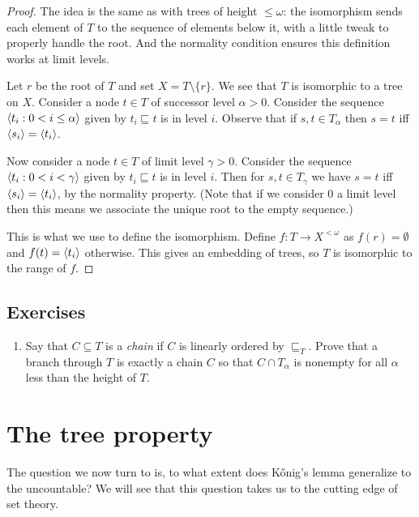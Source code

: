 \documentclass[10pt]{amsart}
\begin{document}
\begin{proof}
The idea is the same as with trees of height $\le \omega$: the isomorphism sends each element of $T$ to the sequence of elements below it, with a little tweak to properly handle the root. And the normality condition ensures this definition works at limit levels.

Let $r$ be the root of $T$ and set $X = T \setminus \{ r \}$. We see that $T$ is isomorphic to a tree on $X$. Consider a node $t \in T$ of successor level $\alpha > 0$. Consider the sequence ${\left\langle  t_i : 0 < i \le \alpha \right\rangle}$ given by $t_i \sqsubseteq t$ is in level $i$. Observe that if $s,t \in T_\alpha$ then $s = t$ iff ${\left\langle s_i \right\rangle} = {\left\langle t_i \right\rangle}$.

Now consider a node $t \in T$ of limit level $\gamma > 0$. Consider the sequence ${\left\langle  t_i : 0 < i < \gamma \right\rangle}$ given by $t_i \sqsubseteq t$ is in level $i$. Then for $s,t \in T_\gamma$ we have $s = t$ iff ${\left\langle s_i \right\rangle} = {\left\langle t_i \right\rangle}$, by the normality property. (Note that if we consider $0$ a limit level then this means we associate the unique root to the empty sequence.)

This is what we use to define the isomorphism. Define $f : T \to X^{<\omega}$ as $f(r) = \emptyset$ and $f(t) = {\left\langle t_i \right\rangle}$ otherwise. This gives an embedding of trees, so $T$ is isomorphic to the range of $f$.
\end{proof}






\subsection*{Exercises}

\begin{enumerate}
\item Say that $C \subseteq T$ is a \emph{chain} if $C$ is linearly ordered by $\sqsubseteq_T$. Prove that a branch through $T$ is exactly a chain $C$ so that $C \cap T_\alpha$ is nonempty for all $\alpha$ less than the height of $T$.
\end{enumerate}

\newpage

\section{The tree property}

The question we now turn to is, to what extent does K\H{o}nig's lemma generalize to the uncountable? We will see that this question takes us to the cutting edge of set theory.
\end{document}
